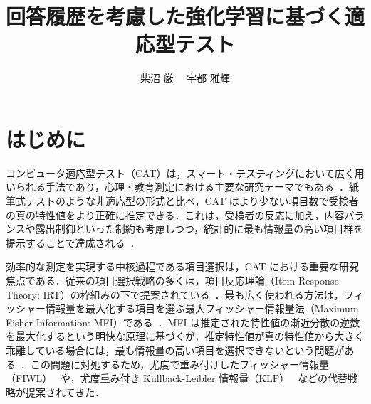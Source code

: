 \documentclass[dvipdfmx,a4j]{jarticle}
\begin{document}
\title{回答履歴を考慮した強化学習に基づく適応型テスト}

\author{柴沼 厳 \ \ 宇都 雅輝}



\maketitle
\thispagestyle{empty}

\section{はじめに}

コンピュータ適応型テスト（CAT）は，スマート・テスティングにおいて広く用いられる手法であり，心理・教育測定における主要な研究テーマでもある~\cite{zhang2016}．紙筆式テストのような非適応型の形式と比べ，CAT はより少ない項目数で受検者の真の特性値をより正確に推定できる．これは，受検者の反応に加え，内容バランスや露出制御といった制約も考慮しつつ，統計的に最も情報量の高い項目群を提示することで達成される~\cite{weiss1982,wainer2000,frey2023}．

効率的な測定を実現する中核過程である項目選択は，CAT における重要な研究焦点である．従来の項目選択戦略の多くは，項目反応理論（Item Response Theory: IRT）の枠組みの下で提案されている~\cite{vanderlinden2016}．最も広く使われる方法は，フィッシャー情報量を最大化する項目を選ぶ最大フィッシャー情報量法（Maximum Fisher Information: MFI）である~\cite{lord1980}．MFI は推定された特性値の漸近分散の逆数を最大化するという明快な原理に基づくが，推定特性値が真の特性値から大きく乖離している場合には，最も情報量の高い項目を選択できないという問題がある~\cite{chang1996}．この問題に対処するため，尤度で重み付けしたフィッシャー情報量（FIWL）~\cite{veerkamp1997} や，尤度重み付き Kullback-Leibler 情報量（KLP）~\cite{chang1996} などの代替戦略が提案されてきた．
\end{document}
